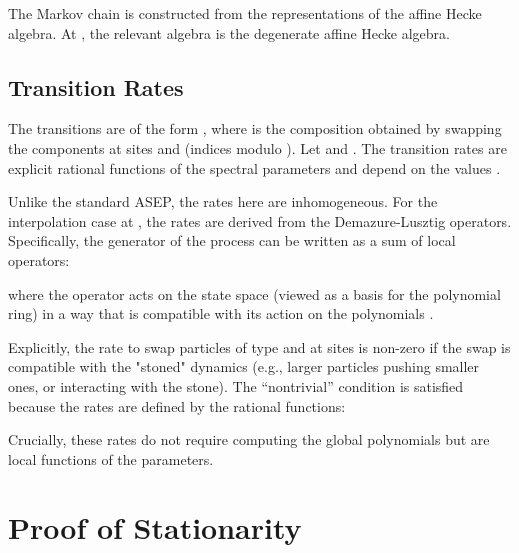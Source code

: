 \documentclass[11pt]{article}
\begin{document}
The Markov chain is constructed from the representations of the affine Hecke algebra. At , the relevant algebra is the degenerate affine Hecke algebra.

\subsection{Transition Rates}
The transitions are of the form , where  is the composition obtained by swapping the components at sites  and  (indices modulo ). Let  and . The transition rates  are explicit rational functions of the spectral parameters  and depend on the values .

Unlike the standard ASEP, the rates here are inhomogeneous. For the interpolation case at , the rates are derived from the Demazure-Lusztig operators. Specifically, the generator  of the process can be written as a sum of local operators:

where the operator  acts on the state space (viewed as a basis for the polynomial ring) in a way that is compatible with its action on the polynomials .

Explicitly, the rate to swap particles of type  and  at sites  is non-zero if the swap is compatible with the "stoned" dynamics (e.g., larger particles pushing smaller ones, or interacting with the stone). The ``nontrivial'' condition is satisfied because the rates are defined by the rational functions:

Crucially, these rates do not require computing the global polynomials  but are local functions of the parameters.

\section{Proof of Stationarity}
\end{document}
